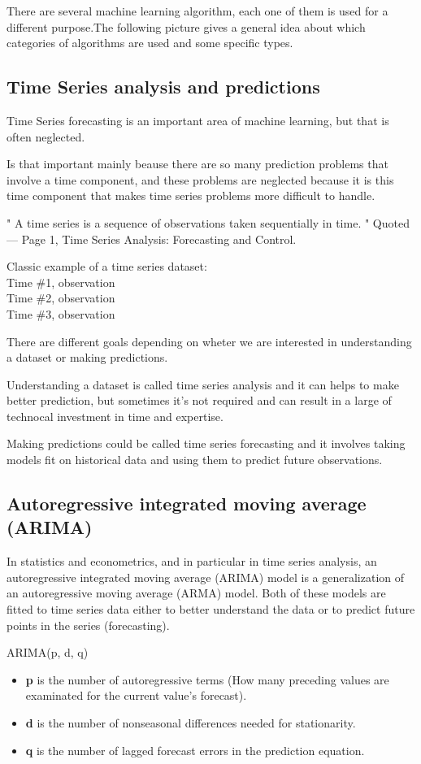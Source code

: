 There are several machine learning algorithm, each one of them is used for a different purpose.The following picture gives a general idea about which categories of algorithms are used and some specific types.


\subsection{Time Series analysis and predictions}
Time Series forecasting is an important area of machine learning, but that is often neglected.

Is that important mainly beause there are so many prediction problems that involve a time component, and these problems are neglected because it is this time component that makes time series problems more difficult to handle.

" A time series is a sequence of observations taken sequentially in time. "
Quoted — Page 1, Time Series Analysis: Forecasting and Control.

Classic example of a time series dataset:\\ 		
Time \#1, observation\\
Time \#2, observation\\
Time \#3, observation

There are different goals depending on wheter we are interested in understanding a dataset or making predictions.

Understanding a dataset is called time series analysis and it can helps to make better prediction, but sometimes it's not required and can result in a large of technocal investment in time and expertise.

Making predictions could be called time series forecasting and it involves taking models fit on historical data and using them to predict future observations.

\subsection{Autoregressive integrated moving average (ARIMA)}

In statistics and econometrics, and in particular in time series analysis, an autoregressive integrated moving average (ARIMA) model is a generalization of an autoregressive moving average (ARMA) model. Both of these models are fitted to time series data either to better understand the data or to predict future points in the series (forecasting).

ARIMA(p, d, q)
\begin{itemize}
\item \textbf{p} is the number of autoregressive terms (How many preceding values are examinated for the current value’s forecast).

\item \textbf{d} is the number of nonseasonal differences needed for stationarity.

\item \textbf{q} is the number of lagged forecast errors in the prediction equation. 
\end{itemize}


